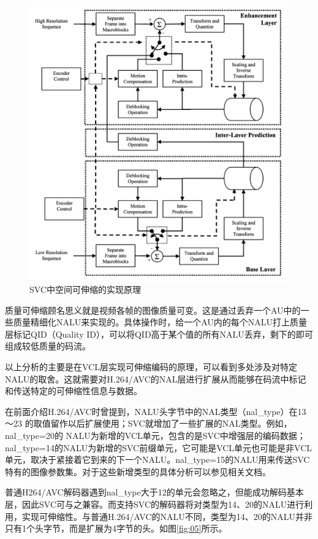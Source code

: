 \begin{figure}[!ht]
	\centering
	\includegraphics[width = 1.0\linewidth]{clip/04-1.png}
	\caption{SVC中空间可伸缩的实现原理\label{fig:04-1}}
\end{figure}

质量可伸缩顾名思义就是视频各帧的图像质量可变。这是通过丢弃一个AU中的一些质量精细化NALU来实现的。具体操作时，给一个AU内的每个NALU打上质量层标记QID（Quality ID），可以将QID高于某个值的所有NALU丢弃，剩下的即可组成较低质量的码流。

以上分析的主要是在VCL层实现可伸缩编码的原理，可以看到多处涉及对特定
NALU的取舍。这就需要对H.264/AVC的NAL层进行扩展从而能够在码流中标记和传送特定的可伸缩性信息与数据。

在前面介绍H.264/AVC时曾提到，NALU头字节中的NAL类型（nal\_type）在13～23
的取值留作以后扩展使用；SVC就增加了一些扩展的NAL类型。例如，nal\_type=20的
NALU为新增的VCL单元，包含的是SVC中增强层的编码数据；nal\_type=14的NALU为新增的SVC前缀单元，它可能是VCL单元也可能是非VCL单元，取决于紧接着它到来的下一个NALU。nal\_type=15的NALU用来传送SVC特有的图像参数集。对于这些新增类型的具体分析可以参见相关文档\supercite{SVC-Interface}。

普通H264/AVC解码器遇到nal\_type大于12的单元会忽略之，但能成功解码基本层，因此SVC可与之兼容。而支持SVC的解码器将对类型为14、20的NALU进行利用，实现可伸缩性。与普通H.264/AVC的NALU不同，类型为14、20的NALU并非只有1个头字节，而是扩展为4字节的头。如图\ref{fig:05}\supercite{SVC-Interface}所示。

